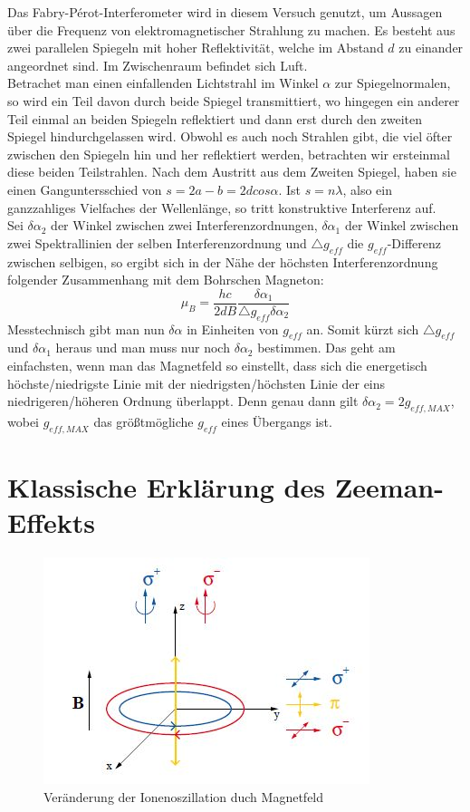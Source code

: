 Das Fabry-Pérot-Interferometer wird in diesem Versuch genutzt, um
Aussagen über die Frequenz von elektromagnetischer Strahlung zu machen.
Es besteht aus zwei parallelen Spiegeln mit hoher Reflektivität, welche
im Abstand $d$ zu einander angeordnet sind. Im Zwischenraum befindet
sich Luft. \\
Betrachet man einen einfallenden Lichtstrahl im Winkel $\alpha$ zur
Spiegelnormalen, so wird ein Teil davon durch beide Spiegel transmittiert,
wo hingegen ein anderer Teil einmal an beiden Spiegeln reflektiert
und dann erst durch den zweiten Spiegel hindurchgelassen wird. Obwohl
es auch noch Strahlen gibt, die viel öfter zwischen den Spiegeln hin
und her reflektiert werden, betrachten wir ersteinmal diese beiden
Teilstrahlen. Nach dem Austritt aus dem Zweiten Spiegel, haben sie
einen Ganguntersschied von $s=2a-b=2dcos\alpha$. Ist $s=n\lambda$,
also ein ganzzahliges Vielfaches der Wellenlänge, so tritt konstruktive
Interferenz auf. \\
Sei $\delta\alpha_{2}$ der Winkel zwischen zwei Interferenzordnungen,
$\delta\alpha_{1}$ der Winkel zwischen zwei Spektrallinien der selben
Interferenzordnung und $\triangle g_{eff}$ die $g_{eff}$-Differenz
zwischen selbigen, so ergibt sich in der Nähe der höchsten Interferenzordnung
folgender Zusammenhang mit dem Bohrschen Magneton:
\[
\mu_{B}=\frac{hc}{2dB}\frac{\delta\alpha_{1}}{\triangle g_{eff}\delta\alpha_{2}}
\]
Messtechnisch gibt man nun $\delta\alpha$ in Einheiten von $g_{eff}$
an. Somit kürzt sich $\triangle g_{eff}$ und $\delta\alpha_{1}$
heraus und man muss nur noch $\delta\alpha_{2}$ bestimmen. Das geht
am einfachsten, wenn man das Magnetfeld so einstellt, dass sich die
energetisch höchste/niedrigste Linie mit der niedrigsten/höchsten
Linie der eins niedrigeren/höheren Ordnung überlappt. Denn genau dann
gilt $\delta\alpha_{2}=$$2g_{eff,MAX}$, wobei $g_{eff,MAX}$ das
größtmögliche $g_{eff}$ eines Übergangs ist. \pagebreak{}


\section{Klassische Erklärung des Zeeman-Effekts}

\begin{figure}%
\includegraphics[scale=0.7]{Zerlegung}

\caption{Veränderung der Ionenoszillation duch Magnetfeld}
\end{figure}%


